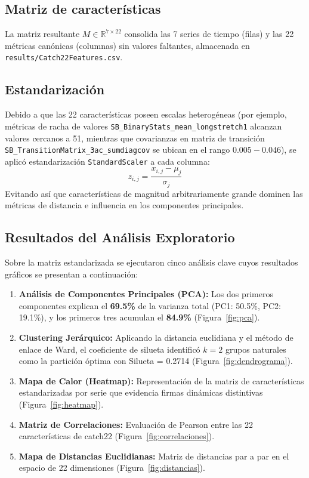 \documentclass[11pt, a4paper]{article}
\begin{document}
\subsection{Matriz de características}
La matriz resultante $M \in \mathbb{R}^{7 \times 22}$ consolida las 7 series de tiempo (filas) y las 22 métricas canónicas (columnas) sin valores faltantes, almacenada en \texttt{results/Catch22Features.csv}.

\subsection{Estandarización}
Debido a que las 22 características poseen escalas heterogéneas (por ejemplo, métricas de racha de valores \texttt{SB\_BinaryStats\_mean\_longstretch1} alcanzan valores cercanos a 51, mientras que covarianzas en matriz de transición \texttt{SB\_TransitionMatrix\_3ac\_sumdiagcov} se ubican en el rango $0.005 - 0.046$), se aplicó estandarización \texttt{StandardScaler} a cada columna:
\begin{equation}
z_{i,j} = \frac{x_{i,j} - \mu_j}{\sigma_j}
\end{equation}
Evitando así que características de magnitud arbitrariamente grande dominen las métricas de distancia e influencia en los componentes principales.

\subsection{Resultados del Análisis Exploratorio}
Sobre la matriz estandarizada se ejecutaron cinco análisis clave cuyos resultados gráficos se presentan a continuación:

\begin{enumerate}
    \item \textbf{Análisis de Componentes Principales (PCA):} Los dos primeros componentes explican el \textbf{69.5\%} de la varianza total (PC1: 50.5\%, PC2: 19.1\%), y los primeros tres acumulan el \textbf{84.9\%} (Figura~\ref{fig:pca}).
    \item \textbf{Clustering Jerárquico:} Aplicando la distancia euclidiana y el método de enlace de Ward, el coeficiente de silueta identificó $k = 2$ grupos naturales como la partición óptima con Silueta = 0.2714 (Figura~\ref{fig:dendrograma}).
    \item \textbf{Mapa de Calor (Heatmap):} Representación de la matriz de características estandarizadas por serie que evidencia firmas dinámicas distintivas (Figura~\ref{fig:heatmap}).
    \item \textbf{Matriz de Correlaciones:} Evaluación de Pearson entre las 22 características de catch22 (Figura~\ref{fig:correlaciones}).
    \item \textbf{Mapa de Distancias Euclidianas:} Matriz de distancias par a par en el espacio de 22 dimensiones (Figura~\ref{fig:distancias}).
\end{enumerate}
\end{document}
